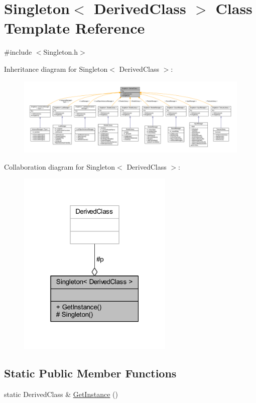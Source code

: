\hypertarget{class_singleton}{}\section{Singleton$<$ Derived\+Class $>$ Class Template Reference}
\label{class_singleton}


{\ttfamily \#include $<$Singleton.\+h$>$}



Inheritance diagram for Singleton$<$ Derived\+Class $>$\+:\nopagebreak
\begin{figure}[H]
\begin{center}
\leavevmode
\includegraphics[width=350pt]{class_singleton__inherit__graph}
\end{center}
\end{figure}


Collaboration diagram for Singleton$<$ Derived\+Class $>$\+:\nopagebreak
\begin{figure}[H]
\begin{center}
\leavevmode
\includegraphics[width=211pt]{class_singleton__coll__graph}
\end{center}
\end{figure}
\subsection*{Static Public Member Functions}
\begin{DoxyCompactItemize}
\item 
static Derived\+Class \& \hyperlink{class_singleton_a74f32751d99bf3cc95fe17aba11f4b07}{Get\+Instance} ()
\end{DoxyCompactItemize}
